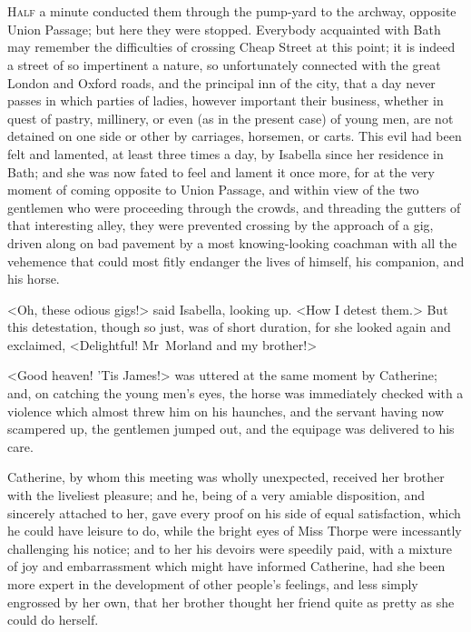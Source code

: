 \chapter[Chapter \thechapter]{} 

 \lettrine{H}{alf} a minute conducted them through the pump-yard to the archway, opposite Union Passage; but here they were stopped. Everybody acquainted with Bath may remember the difficulties of crossing Cheap Street at this point; it is indeed a street of so impertinent a nature, so unfortunately connected with the great London and Oxford roads, and the principal inn of the city, that a day never passes in which parties of ladies, however important their business, whether in quest of pastry, millinery, or even (as in the present case) of young men, are not detained on one side or other by carriages, horsemen, or carts. This evil had been felt and lamented, at least three times a day, by Isabella since her residence in Bath; and she was now fated to feel and lament it once more, for at the very moment of coming opposite to Union Passage, and within view of the two gentlemen who were proceeding through the crowds, and threading the gutters of that interesting alley, they were prevented crossing by the approach of a gig, driven along on bad pavement by a most knowing-looking coachman with all the vehemence that could most fitly endanger the lives of himself, his companion, and his horse. 

 <Oh, these odious gigs!> said Isabella, looking up. <How I detest them.> But this detestation, though so just, was of short duration, for she looked again and exclaimed, <Delightful! Mr~Morland and my brother!> 

 <Good heaven! 'Tis James!> was uttered at the same moment by Catherine; and, on catching the young men's eyes, the horse was immediately checked with a violence which almost threw him on his haunches, and the servant having now scampered up, the gentlemen jumped out, and the equipage was delivered to his care. 

 Catherine, by whom this meeting was wholly unexpected, received her brother with the liveliest pleasure; and he, being of a very amiable disposition, and sincerely attached to her, gave every proof on his side of equal satisfaction, which he could have leisure to do, while the bright eyes of Miss Thorpe were incessantly challenging his notice; and to her his devoirs were speedily paid, with a mixture of joy and embarrassment which might have informed Catherine, had she been more expert in the development of other people's feelings, and less simply engrossed by her own, that her brother thought her friend quite as pretty as she could do herself. 

